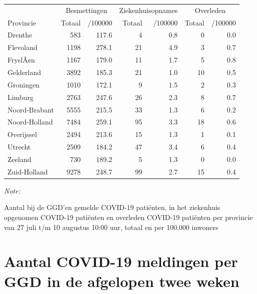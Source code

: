 \documentclass[
  english,
  man,floatsintext]{apa6}
\begin{document}
\begin{table}
\centering
\begin{threeparttable}
\begin{tabular}{lrrrrrr}
\toprule
\multicolumn{1}{c}{ } & \multicolumn{2}{c}{Besmettingen} & \multicolumn{2}{c}{Ziekenhuisopnames} & \multicolumn{2}{c}{Overleden} \\
\cmidrule(l{3pt}r{3pt}){2-3} \cmidrule(l{3pt}r{3pt}){4-5} \cmidrule(l{3pt}r{3pt}){6-7}
Provincie & Totaal & /100000 & Totaal & /100000 & Totaal & /100000\\
\midrule
Drenthe & 583 & 117.6 & 4 & 0.8 & 0 & 0.0\\
Flevoland & 1198 & 278.1 & 21 & 4.9 & 3 & 0.7\\
FryslÃ¢n & 1167 & 179.0 & 11 & 1.7 & 5 & 0.8\\
Gelderland & 3892 & 185.3 & 21 & 1.0 & 10 & 0.5\\
Groningen & 1010 & 172.1 & 9 & 1.5 & 2 & 0.3\\
Limburg & 2763 & 247.6 & 26 & 2.3 & 8 & 0.7\\
Noord-Brabant & 5555 & 215.5 & 33 & 1.3 & 6 & 0.2\\
Noord-Holland & 7484 & 259.1 & 95 & 3.3 & 18 & 0.6\\
Overijssel & 2494 & 213.6 & 15 & 1.3 & 1 & 0.1\\
Utrecht & 2509 & 184.2 & 47 & 3.4 & 6 & 0.4\\
Zeeland & 730 & 189.2 & 5 & 1.3 & 0 & 0.0\\
Zuid-Holland & 9278 & 248.7 & 99 & 2.7 & 15 & 0.4\\
\bottomrule
\end{tabular}
\begin{tablenotes}
\item \textit{Note: } 
\item Aantal bij de GGD’en gemelde COVID-19 patiënten, in het ziekenhuis opgenomen COVID-19 patiënten en overleden COVID-19 patiënten per provincie van 27 juli t/m 10 augustus 10:00 uur, totaal en per 100.000 inwoners
\end{tablenotes}
\end{threeparttable}
\end{table}

\newpage

\hypertarget{aantal-covid-19-meldingen-per-ggd-in-de-afgelopen-twee-weken}{%
\section{Aantal COVID-19 meldingen per GGD in de afgelopen twee weken}\label{aantal-covid-19-meldingen-per-ggd-in-de-afgelopen-twee-weken}}
\end{document}
